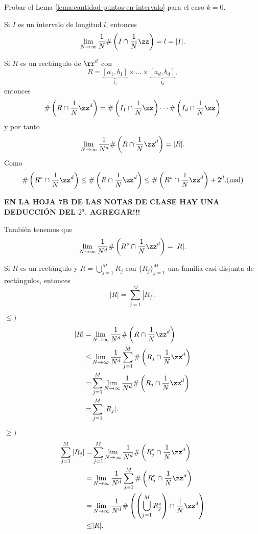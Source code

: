 \begin{ejercicio}{}
Probar el Lema \ref{lema:cantidad-puntos-en-intervalo} para el caso $k=0$.
\end{ejercicio}

\begin{corolario}{}
Si $I$ es un intervalo de longitud $l$, entonces
\[
\lim\limits_{N \to \infty} \frac{1}{N}\# \left(I \cap \frac{1}{N}\zz \right)=l=|I|.
\]
\end{corolario}

Si $R$ es un rect\'angulo de $\rr^d$ con 
\[
R=\underbrace{[a_1,b_1]}_{I_1}\times \ldots \times \underbrace{[a_d,b_d]}_{I_d},
\]
entonces 
\[
\#\left(R \cap \frac{1}{N}\zz^d \right)=
\# \left(I_1 \cap \frac{1}{N}\zz \right)\cdots
\# \left(I_d \cap \frac{1}{N}\zz \right)
\]
y por tanto
\[
\lim\limits_{N \to \infty} \frac{1}{N^d}
\# \left(R \cap \frac{1}{N}\zz^d \right)
=|R|.
\]
Como 
\[
\# \left(R^{\circ} \cap \frac{1}{N}\zz^d \right) 
\leq
\# \left(R \cap \frac{1}{N}\zz^d \right)
\leq 
\# \left(R^{\circ} \cap \frac{1}{N}\zz^d \right) +2^d. (\text{mal})
\]

\textbf{EN LA HOJA 7B DE LAS NOTAS DE CLASE HAY UNA DEDUCCI\'ON DEL $2^d$. AGREGAR!!!}


Tambi\'en tenemos que 
\[
\lim\limits_{N \to \infty} \frac{1}{N^d}
\# \left(R^{\circ} \cap \frac{1}{N}\zz^d \right)
=|R|.
\]

\begin{corolario}{}
Si $R$ es un rect\'angulo y $R= \bigcup\limits_{j=1}^M R_j$ con 
$\{R_j\}_{j=1}^M$ una familia casi disjunta de rect\'angulos, entonces
\[
|R|=\sum\limits_{j=1}^M |R_j|.
\]
\end{corolario}

\begin{demo}
$\leq)$
\[
\begin{split}
|R|=&
\lim\limits_{N \to \infty} \frac{1}{N^d}
\# \left(R \cap \frac{1}{N}\zz^d \right)
\\
\leq & 
\lim\limits_{N \to \infty} \frac{1}{N^d}
\sum\limits_{j=1}^M 
\# \left(R_j \cap \frac{1}{N}\zz^d \right)
\\
=&
\sum\limits_{j=1}^M 
\lim\limits_{N \to \infty} \frac{1}{N^d}
\# \left(R_j \cap \frac{1}{N}\zz^d \right)
\\
=&
\sum\limits_{j=1}^M |R_j|.
\end{split}
\]

$\geq) $
\[\begin{split}
\sum\limits_{j=1}^M |R_j|=&
 \sum\limits_{j=1}^M
\lim\limits_{N \to \infty} 
\frac{1}{N^d} \# \left(R_j^{\circ} \cap \frac{1}{N}\zz^d \right)
\\
=&
\lim\limits_{N \to \infty} 
\frac{1}{N^d} 
\sum\limits_{j=1}^M
\# \left(R_j^{\circ} \cap \frac{1}{N}\zz^d \right)
\\
=&
\lim\limits_{N \to \infty} \frac{1}{N^d}
\# \left(\left(\bigcup\limits_{j=1}^M  R_j^{\circ}\right)
\cap \frac{1}{N} \zz^d\right)
\\
\leq& |R|.
\end{split}
\]
\end{demo}

